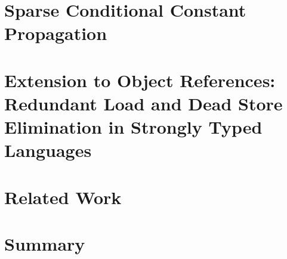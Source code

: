 \section{Sparse Conditional Constant Propagation}
\label{sec:scc}

\section{Extension to Object References: Redundant Load and Dead Store Elimination in Strongly Typed Languages}
\label{sec:heap}

\section{Related Work}
\label{sec:related}

\section{Summary}
\label{sec:conclusions}

